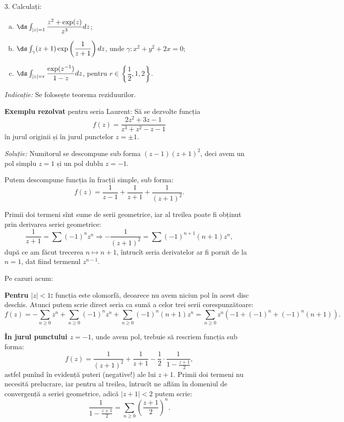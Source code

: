 3. Calculați:
\begin{enumerate}[(a)]
\item $ \ds\int_{|z| = 1} \dfrac{z^2 + \exp(z)}{z^3} dz $;
\item $ \ds\int_\gamma (z + 1) \exp\left(\dfrac{1}{z+1}\right) dz $, unde
  $ \gamma: x^2 + y^2 + 2x = 0 $;
\item $ \ds\int_{|z| = r} \dfrac{\exp(z^{-1})}{1 - z} dz $, pentru $ r \in \left\{ \dfrac{1}{2}, 1, 2 \right\} $.
\end{enumerate}

\emph{Indicație:} Se folosește teorema reziduurilor.

\vspace{0.3cm}

\textbf{Exemplu rezolvat} pentru seria Laurent: Să se dezvolte funcția
\[
  f(z) = \dfrac{2z^2 + 3z - 1}{z^3 + z^2 - z - 1}
\]
în jurul originii și în jurul punctelor $ z = \pm 1 $.

\emph{Soluție:} Numitorul se descompune sub forma $ (z - 1)(z + 1)^2 $,
deci avem un pol simplu $ z = 1 $ și un pol dublu $ z = - 1 $.

Putem descompune funcția în fracții simple, sub forma:
\[
  f(z) = \dfrac{1}{z - 1} + \dfrac{1}{z + 1} + \dfrac{1}{(z + 1)^2}.
\]

Primii doi termeni sînt sume de serii geometrice, iar al treilea poate
fi obținut prin derivarea seriei geometrice:
\[
  \dfrac{1}{z + 1} = \sum (-1)^n z^n \Rightarrow %
  -\dfrac{1}{(z + 1)^2} = \sum (-1)^{n+1} (n + 1) z^n,
\]
după ce am făcut trecerea $ n \mapsto n + 1 $, întrucît seria derivatelor
ar fi pornit de la $ n = 1 $, dat fiind termenul $ z^{n-1} $.

Pe cazuri acum:

\textbf{Pentru $ |z| < 1 $:} funcția este olomorfă, deoarece nu avem
niciun pol în acest disc deschis. Atunci putem scrie direct seria ca sumă
a celor trei serii corespunzătoare:
\[
  f(z) = -\sum_{n \geq 0} z^n + \sum_{n \geq 0} (-1)^n z^n + %
  \sum_{n \geq 0} (-1)^n (n + 1)z^n = %
  \sum_{n \geq 0} z^n \left( -1 + (-1)^n + (-1)^n(n + 1)\right).
\]

\textbf{În jurul punctului $ z = - 1 $}, unde avem pol,
trebuie să rescriem funcția sub forma:
\[
  f(z) = \dfrac{1}{(z + 1)^2} + \dfrac{1}{z + 1} - %
  \dfrac{1}{2} \cdot \dfrac{1}{1 - \frac{z + 1}{2}},
\]
astfel punînd în evidență puteri (negative!) ale lui $ z + 1 $. Primii doi
termeni nu necesită prelucrare, iar pentru al treilea, întrucît
ne aflăm în domeniul de convergență a seriei geometrice, adică $ |z + 1| < 2 $
putem scrie:
\[
  \dfrac{1}{1 - \frac{z + 1}{2}} = \sum_{n \geq 0} \left( \dfrac{z + 1}{2} \right)^n.
\]


